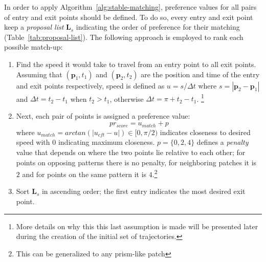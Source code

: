 In order to apply Algorithm~\ref{alg:stable-matching}, preference values for all pairs of entry and exit points should be defined.
To do so, every entry and exit point keep a \emph{proposal list} $\mathbf{L}_s$ indicating the order of preference for their matching (Table~\ref{tab:proposal-list}).
The following approach is employed to rank each possible match-up:
\begin{enumerate}
  \item Find the speed it would take to travel from an entry point to all exit points.
  Assuming that $(\mathbf{p}_1, t_1)$ and $(\mathbf{p}_2,t_2)$ are the position and time of the entry and exit points respectively, speed is defined as $u = s / {\Delta}t$ where $s=|\mathbf{p}_2-\mathbf{p}_1|$ and ${\Delta}t = t_2 - t_1$ when $t_2 > t_1$, otherwise ${\Delta}t=\pi + t_2 - t_1$.
  \footnote{More details on why this this last assumption is made will be presented later during the creation of the initial set of trajectories.}
  \item %
  Next, each pair of points is assigned a preference value:
  \begin{equation}
  	pr_{score} = u_{match} + p
  	\label{eqn:objective_function}
  \end{equation}
  where
  		$u_{match} = arctan(|u_{cft} - u|) \in [0, \pi / 2)$ indicates closeness to desired speed with $0$ indicating maximum closeness. 
    	$p = \{0, 2, 4\}$ defines a \emph{penalty} value that depends on where the two points lie relative to each other; for points on opposing patterns there is no penalty, for neighboring patches it is $2$ and for points on the same pattern it is $4$.\footnote{This can be generalized to any prism-like patch}

  \item Sort $\mathbf{L}_s$ in ascending order; the first entry indicates the most desired exit point.
\end{enumerate}
 

